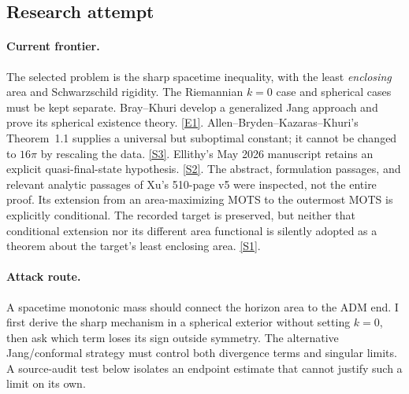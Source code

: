 \documentclass[11pt,a4paper]{article}
\newcommand{\sref}[2]{\hyperlink{source:#1:#2}{[S#2]}}
\newcommand{\eref}[2]{\hyperlink{extra:#1:#2}{[E#2]}}
\numberwithin{equation}{section}
\begin{document}
\subsection{Research attempt}

\paragraph{Current frontier.}
The selected problem is the sharp spacetime inequality, with the least
\emph{enclosing} area and Schwarzschild rigidity. The Riemannian $k=0$ case
and spherical cases must be kept separate. Bray--Khuri develop a generalized
Jang approach and prove its spherical existence theory. \eref{37}{1}.
Allen--Bryden--Kazaras--Khuri's Theorem~1.1 supplies a universal but suboptimal
constant; it cannot be changed to $16\pi$ by rescaling the data.
\sref{37}{3}. Ellithy's May 2026 manuscript retains an explicit quasi-final-state
hypothesis. \sref{37}{2}. The abstract, formulation passages, and relevant
analytic passages of Xu's 510-page v5 were inspected, not the entire proof.
Its extension from an area-maximizing MOTS to the outermost MOTS is explicitly
conditional. The recorded target is preserved, but neither that conditional
extension nor its different area functional is silently adopted as a theorem
about the target's least enclosing area. \sref{37}{1}.

\paragraph{Attack route.}
A spacetime monotonic mass should connect the horizon area to the ADM end.
I first derive the sharp mechanism in a spherical exterior without setting
$k=0$, then ask which term loses its sign outside symmetry. The alternative
Jang/conformal strategy must control both divergence terms and singular
limits. A source-audit test below isolates an endpoint estimate that cannot
justify such a limit on its own.
\end{document}
